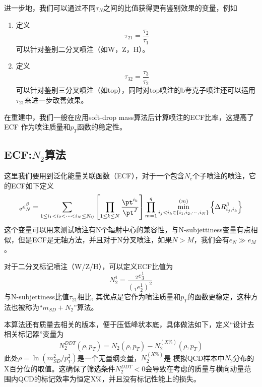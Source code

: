 进一步地，我们可以通过不同$\tau_N$之间的比值获得更有鉴别效果的变量，例如
\begin{enumerate}[(1)]
    \item 定义
    \begin{equation}
        \tau_{21}=\frac{\tau_2}{\tau_1}
    \end{equation}
    可以针对鉴别二分叉喷注（如W，Z，H）。
    \item 定义
    \begin{equation}
        \tau_{32}=\frac{\tau_3}{\tau_2}
    \end{equation}
    可以针对鉴别三分叉喷注（如top），同时对top喷注的b夸克子喷注还可以运用$\tau_{21}$来进一步改善效果。
\end{enumerate}
在重建中，我们一般在应用soft-drop mass算法后计算喷注的ECF比率，这提高了 ECF 作为喷注质量和$p_T$函数的稳定性。

\subsection{ECF:$N_2$算法}
这里我们要用到泛化能量关联函数（ECF），对于一个包含$N_c$个子喷注的喷注，它的ECF如下定义
\begin{equation}
    {}_{q}e_{N}^{\beta}=\sum_{1\leq i_{1}<i_{2}<\cdots<i_{N}\leq N_{\text{C}}}%
\left[\prod_{1\leq k\leq N}\frac{\pt^{i_{k}}}{\pt^{J}}\right]\prod_{m=1}^{q}%
\min_{i_{j}<i_{k}\in\{i_{1},i_{2},\cdots,i_{N}\}}^{(m)}\left\{\Delta R_{i_{j},%
i_{k}}^{\beta}\right\}
\end{equation}
这个变量可以用来测试喷注有N个辐射中心的兼容性，与N-subjettiness变量有点相似，但是ECF是无轴方法，并且对于N分叉喷注，如果$N>M$，我们会有$e_N\gg e_M$。

对于二分叉标记喷注（W/Z/H），可以定义ECF比值为
\begin{equation}
    N_{2}^{1}=\frac{{}_{2}e_{3}^{1}}{(_{1}e_{2}^{1})^{2}}
\end{equation}
与N-subjettiness比值$\tau_{21}$相比, 其优点是它作为喷注质量和$p_T$的函数更稳定，这种方法也被称为“$m_{SD}+N_2$”算法。

本算法还有质量去相关的版本，便于压低峰状本底，具体做法如下，定义“设计去相关标记器”变量为
\begin{equation}
    N_2^{DDT}(\rho,p_T)=N_2(\rho, p_T)-N_2^{(X\%)}(\rho,p_T)
\end{equation}
此处$\rho=\ln{(m_{SD}^2/p_T^2)}$是一个无量纲变量，$N_2^{(X\%)}$是
模拟QCD样本中$N_2$分布的X百分位的取值。这确保了筛选条件$N^{DDT}_2<0$会导致在考虑的质量与横向动量范围内QCD的标记效率为恒定X\%，并且没有标记性能上的损失。


